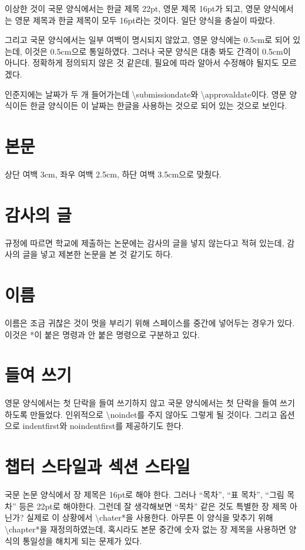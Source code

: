\documentclass[a4paper]{report}
\begin{document}
이상한 것이 국문 양식에서는 한글 제목 22pt, 영문 제목 16pt가 되고,
영문 양식에서는 영문 제목과 한글 제목이 모두 16pt라는 것이다.
일단 양식을 충실이 따랐다.

그리고 국문 양식에서는 일부 여백이 명시되지 않았고,
영문 양식에는 0.5cm로 되어 있는데, 이것은 0.5cm으로 통일하였다.
그러나 국문 양식은 대충 봐도 간격이 0.5cm이 아니다.
정확하게 정의되지 않은 것 같은데, 필요에 따라
알아서 수정해야 될지도 모르겠다.

인준지에는 날짜가 두 개 들어가는데 
\textbackslash submissiondate와 \textbackslash approvaldate이다.
영문 양식이든 한글 양식이든 이 날짜는 한글을 사용하는 것으로
되어 있는 것으로 보인다.

\section{본문}
상단 여백 3cm, 좌우 여백 2.5cm, 하단 여백 3.5cm으로 맞췄다.

\section{감사의 글}
규정에 따르면 학교에 제출하는 논문에는 감사의 글을 넣지 않는다고
적혀 있는데, 감사의 글을 넣고 제본한 논문을 본 것 같기도 하다.

\section{이름}
이름은 조금 귀찮은 것이 멋을 부리기 위해 스페이스를
중간에 넣어두는 경우가 있다. 이것은 *이 붙은 명령과
안 붙은 명령으로 구분하고 있다.

\section{들여 쓰기}
영문 양식에서는 첫 단락을 들여 쓰기하지 않고
국문 양식에서는 첫 단락을 들여 쓰기하도록
만들었다.
인위적으로 \textbackslash noindet를 주지 않아도
그렇게 될 것이다.
그리고 옵션으로 indentfirst와 noindentfirst를 제공하기도 한다.

\section{챕터 스타일과 섹션 스타일}
국문 논문 양식에서 장 제목은 16pt로 해야 한다.
그러나 ``목차'', ``표 목차'', ``그림 목차'' 등은
22pt로 해야한다. 그런데 잘 생각해보면 ``목차''
같은 것도 특별한 장 제목 아닌가?
실제로  이 상황에서 \textbackslash chater*을
사용한다. 아무튼 
이 양식을 맞추기 위해 \textbackslash chapter*을
재정의하였는데, 혹시라도 본문 중간에 숫자 없는 장
제목을 사용하면 양식의 통일성을 해치게 되는 문제가 있다.
\end{document}
